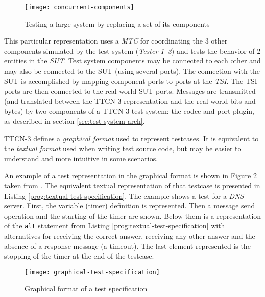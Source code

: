 \begin{figure}[htb]
\centering
\texttt{[image: concurrent-components]}
\caption{Testing a large system by replacing a set of its components%
	\label{fig:concurrent-components}}
\end{figure}

This particular representation uses a \emph{\acl{MTC}}
for coordinating the 3 other components simulated by the test system
(\emph{Tester 1--3})
and tests the behavior of 2 entities in the \emph{\acl{SUT}}.
Test system components may be connected to each other
and may also be connected to the \ac{SUT} (using several ports).
The connection with the \ac{SUT} is accomplished by mapping component ports
to ports at the \emph{\acl{TSI}}.
The \ac{TSI} ports are then connected to the real-world \ac{SUT} ports.
Messages are transmitted (and translated between the \ac{TTCN-3} representation
and the real world bits and bytes)
by two components of a \ac{TTCN-3} test system: the codec and port plugin,
as described in section \ref{sec:test-system-arch}.

\ac{TTCN-3} defines a \emph{graphical format} used to represent testcases.
It is equivalent to the \emph{textual format}
used when writing test source code,
but may be easier to understand and more intuitive in some scenarios.

An example of a test representation in the graphical format
is shown in Figure \ref{fig:graphical-test-specification}
taken from \citep{etsi-ttcn3-tutorial}.
The equivalent textual representation of that testcase
is presented in Listing \ref{prog:textual-test-specification}.
The example shows a test for a \emph{DNS} server.
First, the variable (timer) definition is represented.
Then a message send operation and the starting of the timer are shown.
Below them is a representation of the \verb=alt= statement from
Listing \ref{prog:textual-test-specification} with alternatives for
receiving the correct answer, receiving any other answer
and the absence of a response message (a timeout).
The last element represented
is the stopping of the timer at the end of the testcase.

\begin{figure}
\centering
\texttt{[image: graphical-test-specification]}
\caption{Graphical format of a test specification%
	\label{fig:graphical-test-specification}}
\end{figure}

\begin{program}
\caption{Textual format of a test specification%
	\label{prog:textual-test-specification}}
\end{program}


